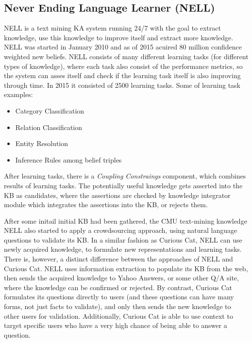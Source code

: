 \subsection{Never Ending Language Learner (NELL)}
\label{section:rw_NELL}
NELL\parencite{Mitchell2015} is a text mining KA system running 24/7 with the
goal to extract knowledge, use this knowledge to improve itself and extract
more knowledge. NELL was started in January 2010 and as of 2015 acuired
80 million confidence weighted new beliefs. NELL consists of many different
learning tasks (for different types of knowledge), where each task also consist
of the performance metrics, so the system can asses itself and check if the 
learning task itself is also improving through time. In 2015 it consisted of
2500 learning tasks. Some of learning task examples:
\begin{itemize}
	\item Category Classification
	\item Relation Classification
	\item Entity Resolution
	\item Inference Rules among belief triples
\end{itemize}
After learning tasks, there is a \emph{Coupling Constraings} component, which
combines results of learning tasks. The potentially useful knowledge gets
asserted into the KB as candidates, where the assertions are checked by knowledge
integrator module which integrates the assertions into the KB, or rejects them.

After some initail initial KB had been gathered, the CMU text-mining knowledge 
NELL also started to apply a crowdsourcing approach\parencite{Pedro2012a},
using natural language questions to validate its KB. In a similar
fashion as Curious Cat, NELL can use newly acquired knowledge, to 
formulate new representations and learning tasks. There is, however, a 
distinct difference between the approaches of NELL and Curious Cat. 
NELL uses information extraction to populate its KB from the web, 
then sends the acquired knowledge to Yahoo Answers, or some other Q/A site, 
where the knowledge can be confirmed or rejected. 
By contrast, Curious Cat formulates its questions directly to users 
(and these questions can have many forms, not just facts to validate), 
and only then sends the new knowledge to other users for validation. 
Additionally, Curious Cat is able to use context to target specific users who 
have a very high chance of being able to answer a question.

